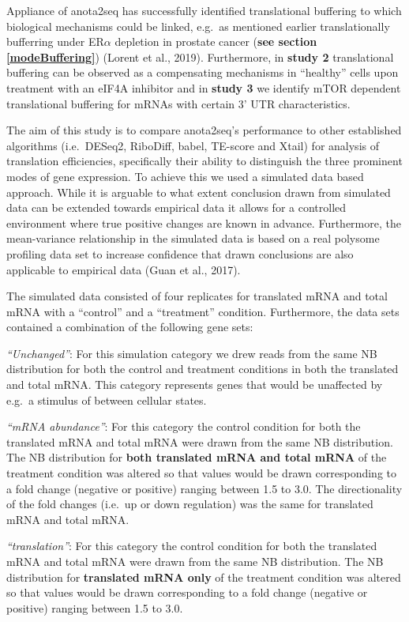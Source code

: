 \documentclass[
  12pt,
  openany]{book}
\begin{document}
Appliance of anota2seq has successfully identified translational buffering to which biological mechanisms could be linked, e.g.~as mentioned earlier translationally bufferring under ER\(\alpha\) depletion in prostate cancer (\textbf{see section \ref{modeBuffering}}) (Lorent et al., 2019). Furthermore, in \textbf{study 2} translational buffering can be observed as a compensating mechanisms in ``healthy'' cells upon treatment with an eIF4A inhibitor and in \textbf{study 3} we identify mTOR dependent translational buffering for mRNAs with certain 3' UTR characteristics.

The aim of this study is to compare anota2seq's performance to other established algorithms (i.e.~DESeq2, RiboDiff, babel, TE-score and Xtail) for analysis of translation efficiencies, specifically their ability to distinguish the three prominent modes of gene expression. To achieve this we used a simulated data based approach. While it is arguable to what extent conclusion drawn from simulated data can be extended towards empirical data it allows for a controlled environment where true positive changes are known in advance. Furthermore, the mean-variance relationship in the simulated data is based on a real polysome profiling data set to increase confidence that drawn conclusions are also applicable to empirical data (Guan et al., 2017).

The simulated data consisted of four replicates for translated mRNA and total mRNA with a ``control'' and a ``treatment'' condition. Furthermore, the data sets contained a combination of the following gene sets:

\emph{``Unchanged''}: For this simulation category we drew reads from the same NB distribution for both the control and treatment conditions in both the translated and total mRNA. This category represents genes that would be unaffected by e.g.~a stimulus of between cellular states.

\emph{``mRNA abundance''}: For this category the control condition for both the translated mRNA and total mRNA were drawn from the same NB distribution. The NB distribution for \textbf{both translated mRNA and total mRNA} of the treatment condition was altered so that values would be drawn corresponding to a fold change (negative or positive) ranging between 1.5 to 3.0. The directionality of the fold changes (i.e.~up or down regulation) was the same for translated mRNA and total mRNA.

\emph{``translation''}: For this category the control condition for both the translated mRNA and total mRNA were drawn from the same NB distribution. The NB distribution for \textbf{translated mRNA only} of the treatment condition was altered so that values would be drawn corresponding to a fold change (negative or positive) ranging between 1.5 to 3.0.
\end{document}
